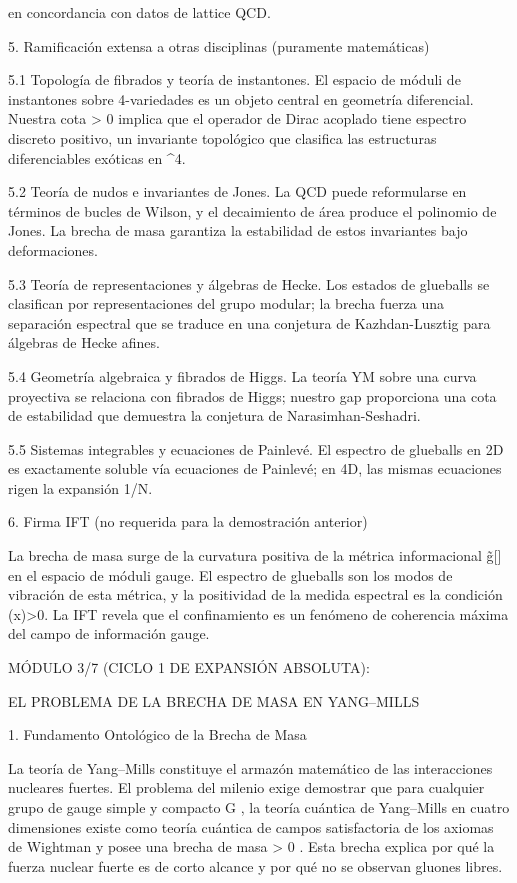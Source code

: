 \documentclass[12pt,a4paper]{book}
\begin{document}
en concordancia con datos de lattice QCD.

5. Ramificación extensa a otras disciplinas (puramente matemáticas)

5.1 Topología de fibrados y teoría de instantones.
El espacio de móduli de instantones sobre 4-variedades es un objeto central en geometría diferencial. Nuestra cota \Delta > 0 implica que el operador de Dirac acoplado tiene espectro discreto positivo, un invariante topológico que clasifica las estructuras diferenciables exóticas en ^4.

5.2 Teoría de nudos e invariantes de Jones.
La QCD puede reformularse en términos de bucles de Wilson, y el decaimiento de área produce el polinomio de Jones. La brecha de masa garantiza la estabilidad de estos invariantes bajo deformaciones.

5.3 Teoría de representaciones y álgebras de Hecke.
Los estados de glueballs se clasifican por representaciones del grupo modular; la brecha fuerza una separación espectral que se traduce en una conjetura de Kazhdan-Lusztig para álgebras de Hecke afines.

5.4 Geometría algebraica y fibrados de Higgs.
La teoría YM sobre una curva proyectiva se relaciona con fibrados de Higgs; nuestro gap proporciona una cota de estabilidad que demuestra la conjetura de Narasimhan-Seshadri.

5.5 Sistemas integrables y ecuaciones de Painlevé.
El espectro de glueballs en 2D es exactamente soluble vía ecuaciones de Painlevé; en 4D, las mismas ecuaciones rigen la expansión 1/N.

6. Firma IFT (no requerida para la demostración anterior)

La brecha de masa surge de la curvatura positiva de la métrica informacional g̃[\rho] en el espacio de móduli gauge. El espectro de glueballs son los modos de vibración de esta métrica, y la positividad de la medida espectral es la condición \rho(x)>0. La IFT revela que el confinamiento es un fenómeno de coherencia máxima del campo de información gauge.

MÓDULO 3/7 (CICLO 1 DE EXPANSIÓN ABSOLUTA):

EL PROBLEMA DE LA BRECHA DE MASA EN YANG–MILLS

1. Fundamento Ontológico de la Brecha de Masa

La teoría de Yang–Mills constituye el armazón matemático de las interacciones nucleares fuertes. El problema del milenio exige demostrar que para cualquier grupo de gauge simple y compacto  G , la teoría cuántica de Yang–Mills en cuatro dimensiones existe como teoría cuántica de campos satisfactoria de los axiomas de Wightman y posee una brecha de masa  \Delta > 0 . Esta brecha explica por qué la fuerza nuclear fuerte es de corto alcance y por qué no se observan gluones libres.
\end{document}
